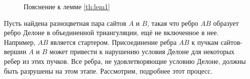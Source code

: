 \documentclass[12pt]{article}
\begin{document}
\begin{figure}[htb!]
	\begin{minipage}[h]{0.49\linewidth}
	\end{minipage}
	\hfill
	\begin{minipage}[h]{0.49\linewidth}
	\end{minipage}
	\caption{Пояснение к лемме \ref{th:lem1}}
	\label{pic:lem1}
\end{figure}

Пусть найдена разноцветная пара сайтов $A$ и $B$, такая что ребро $AB$ образует ребро Делоне в объединенной триангуляции,
ещё не включенное в нее.
Например, $AB$ является стартером.
Присоединение ребра $AB$ к пучкам сайтов-вершин $A$ и $B$ может привести к нарушению условия Делоне для некоторых ребер из этих пучков.
Все ребра, не удовлетворяющие условию Делоне, должны быть разрушены на этом этапе.
Рассмотрим, подробнее этот процесс.
\end{document}
